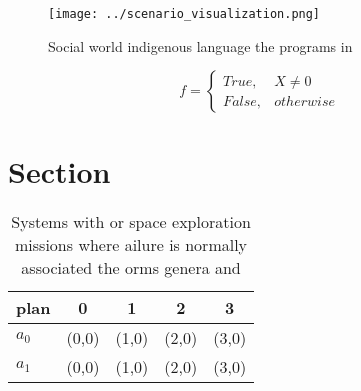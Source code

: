 \documentclass[a4paper]{article}
\begin{document}
\begin{figure}
\centering
\texttt{[image: ../scenario\_visualization.png]}
\caption{Social world indigenous language the programs in 
}
\end{figure}
 
\begin{equation}   f =
\begin{cases} True, & X \neq 0\\
False, & otherwise
\end{cases}
\end{equation}

\section{Section}

\begin{table}
\begin{adjustbox}{width=0.5\columnwidth}
\begin{tabular}{|l|l|l|l|l|}
\hline
\textbf{plan} & \multicolumn{1}{c|}{\textbf{0}} & \multicolumn{1}{c|}{\textbf{1}} & \multicolumn{1}{c|}{\textbf{2}} & \multicolumn{1}{c|}{\textbf{3}} \\ \hline
\textbf{$a_0$}  & (0,0) & (1,0) & (2,0) & (3,0) \\ \hline
\textbf{$a_1$}  & (0,0) & (1,0) & (2,0) & (3,0) \\ \hline
\end{tabular}
\end{adjustbox}
\caption{Systems with or space exploration missions where ailure is normally associated the orms genera and 
}
\end{table}
\end{document}
